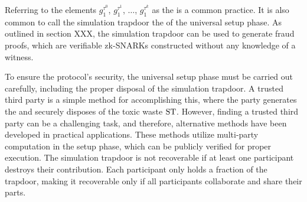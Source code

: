 Referring to the elements $g_{1}^{\tau^0}$, $g_{1}^{\tau^1}$, $\ldots$, $g_{1}^{\tau^k}$ as the  is a common practice. It is also common to call the simulation trapdoor the  of the universal setup phase. As outlined in section XXX, the simulation trapdoor can be used to generate fraud proofs, which are verifiable zk-SNARKs constructed without any knowledge of a witness.

To ensure the protocol's security, the universal setup phase must be carried out carefully, including the proper disposal of the simulation trapdoor. A trusted third party is a simple method for accomplishing this, where the party generates the  and securely disposes of the toxic waste $\mathrm{ST}$. However, finding a trusted third party can be a challenging task, and therefore, alternative methods have been developed in practical applications. These methods utilize multi-party computation in the setup phase, which can be publicly verified for proper execution. The simulation trapdoor is not recoverable if at least one participant destroys their contribution. Each participant only holds a fraction of the trapdoor, making it recoverable only if all participants collaborate and share their parts.


